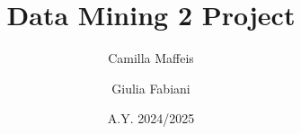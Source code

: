 \documentclass[a4paper, 10pt, twocolumn, DIV=calc]{scrartcl}
\begin{document}
\author{Camilla Maffeis \and Giulia Fabiani}
\title{Data Mining 2 Project}
\date{A.Y. 2024/2025}

\maketitle
\end{document}
